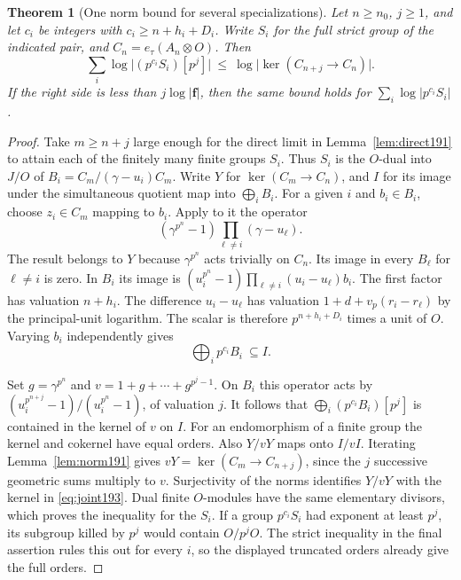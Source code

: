 \documentclass[a4paper,11pt]{article}
\newtheorem{theorem}[proposition]{Theorem}
\theoremstyle{definition}
\theoremstyle{remark}
\numberwithin{equation}{section}
\begin{document}
\begin{theorem}[One norm bound for several specializations]\label{thm:joint193}
Let \(n\ge n_0\), \(j\ge1\), and let \(c_i\) be integers with
\(c_i\ge n+h_i+D_i\). Write \(S_i\) for the full strict group
of the indicated pair, and \(C_n=e_\tau(A_n\otimes O)\).
Then
\begin{equation}
     \sum_i \log\big|(p^{c_i}S_i)[p^j]\big|
       \ \le\ \log \big|\ker(C_{n+j}\longrightarrow C_n)\big| .
       \label{eq:joint193}
\end{equation}
If the right side is less than \(j\log|\mathbf f|\), then
the same bound holds for \(\sum_i\log|p^{c_i}S_i|\).
\end{theorem}
\begin{proof}
Take \(m\ge n+j\) large enough for the direct limit in
Lemma~\ref{lem:direct191} to attain each of the finitely many
finite groups \(S_i\). Thus \(S_i\) is the \(O\)-dual into
\(J/O\) of \(B_i=C_m/(\gamma-u_i)C_m\). Write \(Y\) for
\(\ker(C_m\to C_n)\), and \(I\) for its image under the
simultaneous quotient map into \(\bigoplus_i B_i\).
For a given \(i\) and \(b_i\in B_i\), choose \(z_i\in C_m\)
mapping to \(b_i\). Apply to it the operator
\[
    (\gamma^{p^n}-1)\prod_{\ell\ne i}(\gamma-u_\ell).
\]
The result belongs to \(Y\) because \(\gamma^{p^n}\) acts
trivially on \(C_n\). Its image in every \(B_\ell\) for
\(\ell\ne i\) is zero. In \(B_i\) its image is
\((u_i^{p^n}-1)\prod_{\ell\ne i}(u_i-u_\ell)b_i\).
The first factor has valuation \(n+h_i\). The difference
\(u_i-u_\ell\) has valuation \(1+d+v_p(r_i-r_\ell)\) by the
principal-unit logarithm. The scalar is therefore \(p^{n+h_i+D_i}\)
times a unit of \(O\). Varying \(b_i\) independently gives
\[
                 \bigoplus_i p^{c_i}B_i\ \subseteq I .
\]

Set \(g=\gamma^{p^n}\) and \(v=1+g+\cdots+g^{p^j-1}\).
On \(B_i\) this operator acts by
\((u_i^{p^{n+j}}-1)/(u_i^{p^n}-1)\), of valuation \(j\).
It follows that \(\bigoplus_i(p^{c_i}B_i)[p^j]\) is contained
in the kernel of \(v\) on \(I\). For an endomorphism of a
finite group the kernel and cokernel have equal orders. Also
\(Y/vY\) maps onto \(I/vI\). Iterating Lemma~\ref{lem:norm191}
gives \(vY=\ker(C_m\to C_{n+j})\), since the \(j\) successive
geometric sums multiply to \(v\). Surjectivity of the norms
identifies \(Y/vY\) with the kernel in \eqref{eq:joint193}.
Dual finite \(O\)-modules have the same elementary divisors,
which proves the inequality for the \(S_i\).
If a group \(p^{c_i}S_i\) had exponent at least \(p^j\), its
subgroup killed by \(p^j\) would contain \(O/p^jO\). The strict
inequality in the final assertion rules this out for every \(i\),
so the displayed truncated orders already give the full orders.
\end{proof}
\end{document}
